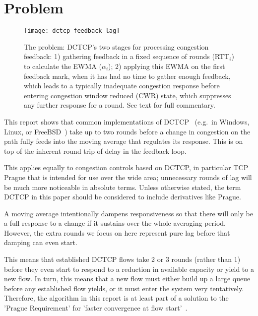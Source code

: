 \section{Problem}\label{prresp_Problem}

\begin{figure*}
	\texttt{[image: dctcp-feedback-lag]}
	\caption{The problem: DCTCP's two stages for processing congestion feedback: 1)
	gathering feedback in a fixed sequence of rounds (RTT\(_i\)) to calculate the
	EWMA (\(\alpha_i\)); 2) applying this EWMA on the first feedback mark, when it
	has had no time to gather enough feedback, which leads to a typically
	inadequate congestion response before entering congestion window reduced (CWR)
	state, which suppresses any further response for a round. See text for full
	commentary.}
	\label{fig:dctcp-feedback-lag}
\end{figure*}

This report shows that common implementations of DCTCP~\cite{Alizadeh10:DCTCP}
(e.g.\ in Windows, Linux, or FreeBSD~\cite{Bensley17:DCTCP}) take up to two
rounds before a change in congestion on the path fully feeds into the moving
average that regulates its response. This is on top of the inherent round trip
of delay in the feedback loop.

This applies equally to congestion controls based on DCTCP, in particular TCP
Prague that is intended for use over the wide area; unnecessary rounds of lag
will be much more noticeable in absolute terms. Unless otherwise stated, the
term DCTCP in this paper should be considered to include derivatives like
Prague.

A moving average intentionally dampens responsiveness so that there will only be
a full response to a change if it sustains over the whole averaging period.
However, the extra rounds we focus on here represent pure lag before that
damping can even start.

This means that established DCTCP flows take 2 or 3 rounds (rather than 1)
before they even start to respond to a reduction in available capacity or yield
to a new flow. In turn, this means that a new flow must either build up a large
queue before any established flow yields, or it must enter the system very
tentatively. Therefore, the algorithm in this report is at least part of a
solution to the 'Prague Requirement' for 'faster convergence at flow
start'~\cite[Appx A.2.3]{Briscoe15f:ecn-l4s-id_ID}.

